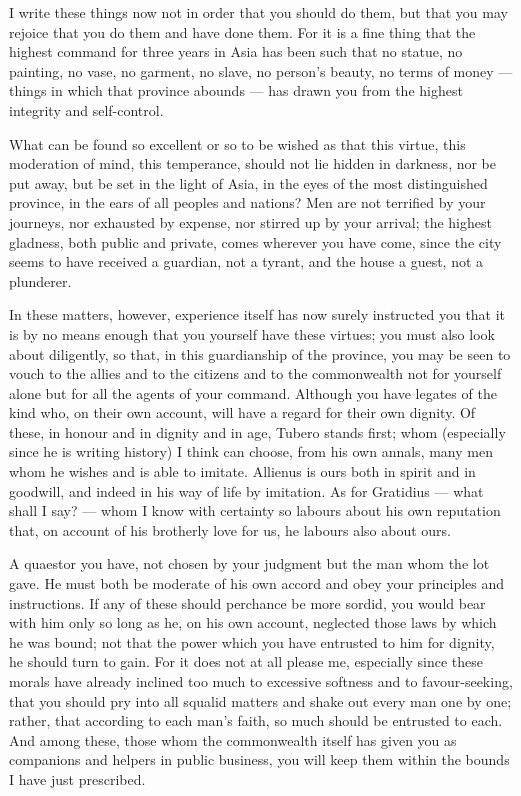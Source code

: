  I write these things now not in order that you should do them, but that you may rejoice that you do them and have done them. For it is a fine thing that the highest command for three years in Asia has been such that no statue, no painting, no vase, no garment, no slave, no person's beauty, no terms of money --- things in which that province abounds --- has drawn you from the highest integrity and self-control.

 What can be found so excellent or so to be wished as that this virtue, this moderation of mind, this temperance, should not lie hidden in darkness, nor be put away, but be set in the light of Asia, in the eyes of the most distinguished province, in the ears of all peoples and nations? Men are not terrified by your journeys, nor exhausted by expense, nor stirred up by your arrival; the highest gladness, both public and private, comes wherever you have come, since the city seems to have received a guardian, not a tyrant, and the house a guest, not a plunderer.

 In these matters, however, experience itself has now surely instructed you that it is by no means enough that you yourself have these virtues; you must also look about diligently, so that, in this guardianship of the province, you may be seen to vouch to the allies and to the citizens and to the commonwealth not for yourself alone but for all the agents of your command. Although you have legates of the kind who, on their own account, will have a regard for their own dignity. Of these, in honour and in dignity and in age, Tubero stands first; whom (especially since he is writing history) I think can choose, from his own annals, many men whom he wishes and is able to imitate. Allienus is ours both in spirit and in goodwill, and indeed in his way of life by imitation. As for Gratidius --- what shall I say? --- whom I know with certainty so labours about his own reputation that, on account of his brotherly love for us, he labours also about ours.

 A quaestor you have, not chosen by your judgment but the man whom the lot gave. He must both be moderate of his own accord and obey your principles and instructions. If any of these should perchance be more sordid, you would bear with him only so long as he, on his own account, neglected those laws by which he was bound; not that the power which you have entrusted to him for dignity, he should turn to gain. For it does not at all please me, especially since these morals have already inclined too much to excessive softness and to favour-seeking, that you should pry into all squalid matters and shake out every man one by one; rather, that according to each man's faith, so much should be entrusted to each. And among these, those whom the commonwealth itself has given you as companions and helpers in public business, you will keep them within the bounds I have just prescribed.

